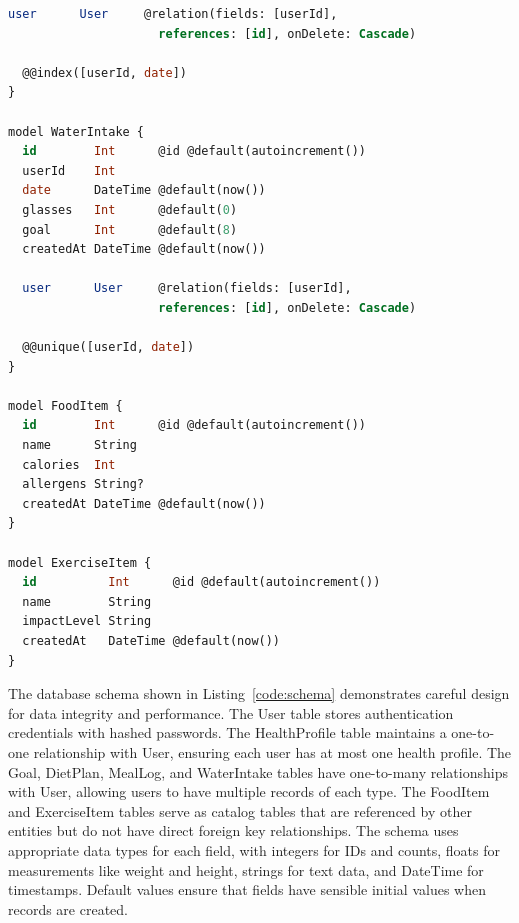 \begin{lstlisting}[language=SQL, caption=Complete Prisma Database Schema, label=code:schema]
  user      User     @relation(fields: [userId], 
                     references: [id], onDelete: Cascade)
  
  @@index([userId, date])
}

model WaterIntake {
  id        Int      @id @default(autoincrement())
  userId    Int
  date      DateTime @default(now())
  glasses   Int      @default(0)
  goal      Int      @default(8)
  createdAt DateTime @default(now())
  
  user      User     @relation(fields: [userId], 
                     references: [id], onDelete: Cascade)
  
  @@unique([userId, date])
}

model FoodItem {
  id        Int      @id @default(autoincrement())
  name      String
  calories  Int
  allergens String?
  createdAt DateTime @default(now())
}

model ExerciseItem {
  id          Int      @id @default(autoincrement())
  name        String
  impactLevel String
  createdAt   DateTime @default(now())
}
\end{lstlisting}

The database schema shown in Listing~\ref{code:schema} demonstrates careful design for data integrity and performance. The User table stores authentication credentials with hashed passwords. The HealthProfile table maintains a one-to-one relationship with User, ensuring each user has at most one health profile. The Goal, DietPlan, MealLog, and WaterIntake tables have one-to-many relationships with User, allowing users to have multiple records of each type. The FoodItem and ExerciseItem tables serve as catalog tables that are referenced by other entities but do not have direct foreign key relationships. The schema uses appropriate data types for each field, with integers for IDs and counts, floats for measurements like weight and height, strings for text data, and DateTime for timestamps. Default values ensure that fields have sensible initial values when records are created.
